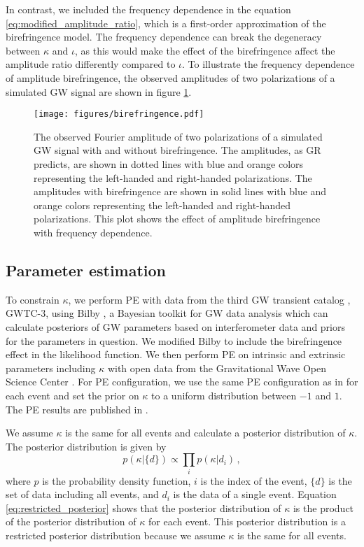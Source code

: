 \documentclass[aps,prd,twocolumn,superscriptaddress,preprintnumbers,floatfix,nofootinbib]{revtex4-2}
\begin{document}
In contrast, we included the frequency dependence in the equation \ref{eq:modified_amplitude_ratio}, which is a first-order approximation of the birefringence model.
The frequency dependence can break the degeneracy between $\kappa$ and $\iota$, as this would make the effect of the birefringence affect the amplitude ratio differently compared to $\iota$.
To illustrate the frequency dependence of amplitude birefringence, the observed amplitudes of two polarizations of a simulated GW signal are shown in figure \ref{fig:birefringence}.

\begin{figure}[h]
    \texttt{[image: figures/birefringence.pdf]}
    \caption{
        The observed Fourier amplitude of two polarizations of a simulated GW signal with and without birefringence.
        The amplitudes, as GR predicts, are shown in dotted lines with blue and orange colors representing the left-handed and right-handed polarizations.
        The amplitudes with birefringence are shown in solid lines with blue and orange colors representing the left-handed and right-handed polarizations.
        This plot shows the effect of amplitude birefringence with frequency dependence.
    }
    \label{fig:birefringence}
\end{figure}

\subsection{Parameter estimation}
To constrain $\kappa$, we perform PE with data from the third GW transient catalog \citep{GWTC-2.1, GWTC-3}, GWTC-3, using Bilby \citep{Bilby}, a Bayesian toolkit for GW data analysis which can calculate posteriors of GW parameters based on interferometer data and priors for the parameters in question.
We modified Bilby to include the birefringence effect in the likelihood function.
We then perform PE on intrinsic and extrinsic parameters including $\kappa$ with open data from the Gravitational Wave Open Science Center \citep{GWOSC}.
For PE configuration, we use the same PE configuration as in \citet{GWTC-2.1, GWTC-3} for each event and set the prior on $\kappa$ to a uniform distribution between $-1$ and $1$.
The PE results are published in \citet{dataset}.

We assume $\kappa$ is the same for all events and calculate a posterior distribution of $\kappa$.
The posterior distribution is given by
\begin{equation}
    p(\kappa|\{d\})\propto \prod_{i}p(\kappa|d_i)\,,
    \label{eq:restricted_posterior}
\end{equation}
where $p$ is the probability density function, $i$ is the index of the event, $\{d\}$ is the set of data including all events, and $d_i$ is the data of a single event.
Equation \ref{eq:restricted_posterior} shows that the posterior distribution of $\kappa$ is the product of the posterior distribution of $\kappa$ for each event.
This posterior distribution is a restricted posterior distribution because we assume $\kappa$ is the same for all events.
\end{document}
